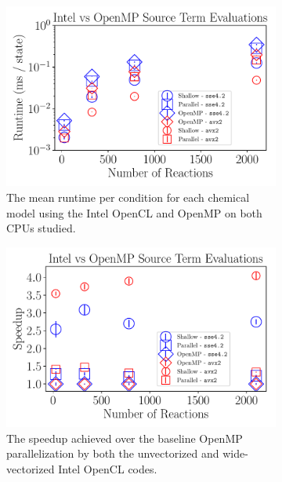 \documentclass[12pt,number,sort&compress,preprint]{elsarticle}
\begin{document}
\begin{figure}[htb]
   \centering
  \begin{subfigure}[t]{0.45\linewidth}
      \includegraphics[width=\textwidth]{intel_source_nonorm.pdf}
      \caption{The mean runtime per condition for each chemical model using the Intel OpenCL and OpenMP on both CPUs studied.}
      \label{F:intel_source_noorm}
  \end{subfigure}
  \hfill
  \begin{subfigure}[t]{0.45\linewidth}
      \includegraphics[width=\textwidth]{intel_source.pdf}
      \caption{The speedup achieved over the baseline OpenMP parallelization by both the unvectorized and wide-vectorized Intel OpenCL codes.}
      \label{F:intel_source}
  \end{subfigure}
  \\
  \begin{subfigure}[t]{0.45\linewidth}

\end{subfigure}
\end{figure}
\end{document}

